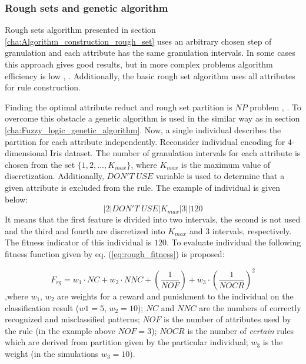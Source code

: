 \subsubsection{Rough sets and genetic algorithm}
\label{cha:Multistage_rough_genetic}
Rough sets algorithm presented in section \ref{cha:Algorithm_construction_rough_set} uses an 
arbitrary chosen step of granulation and each attribute has the same
granulation intervals. In some cases this approach gives good results, but in more
complex problems algorithm efficiency is low \cite{bib24}, \cite{bib29}. Additionally, the basic rough set
algorithm uses all attributes for rule construction.

Finding the optimal attribute reduct and rough set partition is $NP$ problem \cite{bib19}, \cite{bib1}.
To overcome this obstacle a genetic algorithm is used in the similar way as in section
\ref{cha:Fuzzy_logic_genetic_algorithm}. Now, a single individual describes the
partition for each attribute independently. Reconsider individual encoding for
$4$-dimensional Iris dataset. The number of granulation intervals for each attribute is
chosen from the set $\{1, 2, \ldots, K_{max}\}$, where $K_{max}$ is the maximum
value of discretization. Additionally, $DON'T\; USE$ variable is used to
determine that a given attribute is excluded from the rule. The example of
individual is given below:
$$|2|DON'T \; USE|K_{max}|3||120$$
It means that the first feature is divided into two intervals, the second is
not used and the third and fourth are discretized into $K_{max}$ and 3
intervals, respectively. The fitness indicator of this individual is $120$.
To evaluate individual the following fitness function given by eq.
(\ref{eq:rough_fitness}) is proposed:

\begin{equation}
    F_{rg} = w_1\cdot NC + w_2\cdot NNC + (\frac{1}{NOF}) +w_3\cdot (\frac{1}{NOCR})^2
    \label{eq:rough_fitness}
\end{equation}
,where $w_1$, $w_2$ are weights for a reward and punishment to
the individual on the classification result ($w1=5$, $w_2=10$); $NC$ and $NNC$ are
the numbers of correctly recognized and misclassified patterns; $NOF$ is the number of
attributes used by the rule (in the example above $NOF=3$);
$NOCR$ is the number of \textit{certain} rules which are derived from
partition given by the particular individual; $w_3$ is the weight (in the simulations
$w_3=10$).

